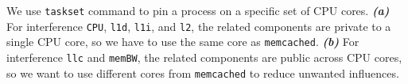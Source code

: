 

We use \texttt{taskset} command  to pin a process on a specific set of CPU cores.
\emph{\textbf{(a)}} For interference \texttt{CPU}, \texttt{l1d}, \texttt{l1i}, and \texttt{l2}, the
related components are private to a single CPU core, so we have to use the same core as
\texttt{memcached}. 
\emph{\textbf{(b)}} For interference \texttt{llc} and \texttt{memBW}, the related components are
public across CPU cores, so we want to use different cores from \texttt{memcached} to reduce
unwanted influences.
